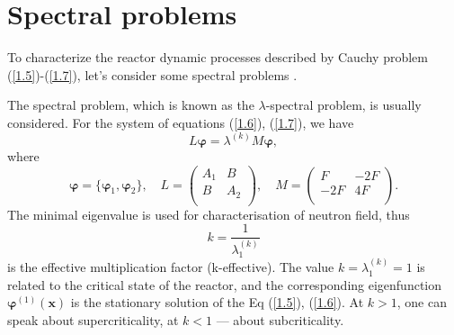\documentclass[authoryear]{elsarticle}
\begin{document}
\section{Spectral problems}
To characterize the reactor dynamic processes described by
Cauchy problem (\ref{1.5})-(\ref{1.7}), let’s consider some spectral problems \citep{bell1970,stacey2007}.

The spectral problem, which is known as the $\lambda$-spectral problem, is usually considered.
For the system of equations (\ref{1.6}), (\ref{1.7}), we have
\begin{equation}\label{1.8}
L \bm \varphi = \lambda^{(k)} M \bm \varphi,
\end{equation}
where
\[
\bm \varphi = \{\bm \varphi_1, \bm \varphi_2\},
\quad
L = \begin{pmatrix}
A_1 & B \\
B & A_2 \\
\end{pmatrix},
\quad
M = \begin{pmatrix}
F & -2F \\
-2F & 4F \\
\end{pmatrix}.
\]
The minimal eigenvalue is used for characterisation of neutron field, thus
\[
 k = \frac{1}{\lambda^{(k)}_1}  
\] 
is the effective multiplication factor (k-effective).
The value $k = \lambda^{(k)}_1 = 1$ is related to the critical state of the reactor, and the corresponding eigenfunction $\bm{\varphi}^{(1)}(\bm x)$ is the stationary solution of the Eq (\ref{1.5}), (\ref{1.6}).
At $k > 1$, one can speak about supercriticality, at $k < 1$ --- about subcriticality.

\end{document}
